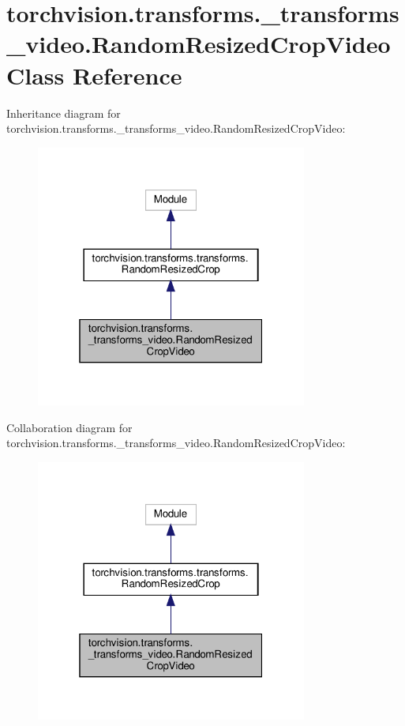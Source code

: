 \hypertarget{classtorchvision_1_1transforms_1_1__transforms__video_1_1RandomResizedCropVideo}{}\section{torchvision.\+transforms.\+\_\+transforms\+\_\+video.\+Random\+Resized\+Crop\+Video Class Reference}
\label{classtorchvision_1_1transforms_1_1__transforms__video_1_1RandomResizedCropVideo}


Inheritance diagram for torchvision.\+transforms.\+\_\+transforms\+\_\+video.\+Random\+Resized\+Crop\+Video\+:
\nopagebreak
\begin{figure}[H]
\begin{center}
\leavevmode
\includegraphics[width=253pt]{classtorchvision_1_1transforms_1_1__transforms__video_1_1RandomResizedCropVideo__inherit__graph}
\end{center}
\end{figure}


Collaboration diagram for torchvision.\+transforms.\+\_\+transforms\+\_\+video.\+Random\+Resized\+Crop\+Video\+:
\nopagebreak
\begin{figure}[H]
\begin{center}
\leavevmode
\includegraphics[width=253pt]{classtorchvision_1_1transforms_1_1__transforms__video_1_1RandomResizedCropVideo__coll__graph}
\end{center}
\end{figure}

